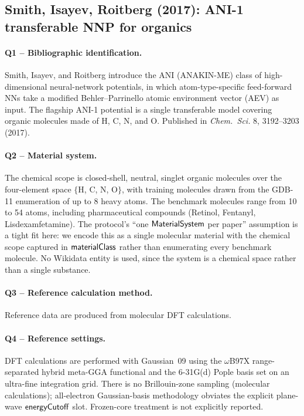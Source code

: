 \subsection{Smith, Isayev, Roitberg (2017): ANI-1 transferable NNP for organics}
\label{sec:appendix-example-smith2017}

\paragraph{Q1 -- Bibliographic identification.}
Smith, Isayev, and Roitberg introduce the ANI (ANAKIN-ME)
class of high-dimensional neural-network potentials, in which
atom-type-specific feed-forward NNs take a modified
Behler--Parrinello atomic environment vector (AEV) as input.
The flagship ANI-1 potential is a single transferable model
covering organic molecules made of H, C, N, and O. Published in
\emph{Chem.\ Sci.} 8, 3192--3203 (2017).


\paragraph{Q2 -- Material system.}
The chemical scope is closed-shell, neutral, singlet organic
molecules over the four-element space $\{$H, C, N, O$\}$, with
training molecules drawn from the GDB-11 enumeration of up to
8 heavy atoms. The benchmark molecules range from 10 to 54
atoms, including pharmaceutical compounds (Retinol, Fentanyl,
Lisdexamfetamine). The protocol's ``one $\mathsf{MaterialSystem}$ per
paper'' assumption is a tight fit here: we encode this as a
single molecular material with the chemical scope captured in
$\mathsf{materialClass}$ rather than enumerating every benchmark
molecule. No Wikidata entity is used, since the system is a
chemical space rather than a single substance.


\paragraph{Q3 -- Reference calculation method.}
Reference data are produced from molecular DFT calculations.


\paragraph{Q4 -- Reference settings.}
DFT calculations are performed with Gaussian~09 using the
$\omega$B97X range-separated hybrid meta-GGA functional and the
6-31G(d) Pople basis set on an ultra-fine integration grid.
There is no Brillouin-zone sampling (molecular calculations);
all-electron Gaussian-basis methodology obviates the explicit
plane-wave $\mathsf{energyCutoff}$ slot. Frozen-core treatment
is not explicitly reported.


